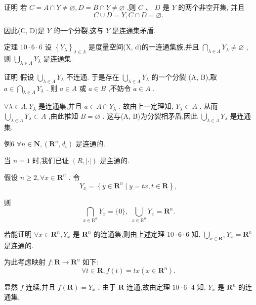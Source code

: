 证明 若 $C = A \cap  Y \neq  \varnothing ,D = B \cap  Y \neq  \varnothing$ ,则 $C\text{ 、 }D$ 是 $Y$ 的两个非空开集, 并且
$$C \cup  D = Y,C \cap  D = \varnothing .$$

因此(C, D)是 $Y$ 的一个分裂,这与 $Y$ 是连通集矛盾.

定理 ${10} \cdot  6 \cdot  6$ 设 ${\left\{  {Y}_{\lambda }\right\}  }_{\lambda  \in  \Lambda }$ 是度量空间(X, d)的一连通集族,并且 $\mathop{\bigcap }\limits_{{\lambda  \in  \Lambda }}{Y}_{\lambda } \neq  \varnothing$ ,则 $\mathop{\bigcup }\limits_{{\lambda  \in  \Lambda }}{Y}_{\lambda }$ 是连通集.

证明 假设 $\mathop{\bigcup }\limits_{{\lambda  \in  \Lambda }}{Y}_{\lambda }$ 不连通. 于是存在 $\mathop{\bigcup }\limits_{{\lambda  \in  \Lambda }}{Y}_{\lambda }$ 的一个分裂 (A, B),取 $a \in  \mathop{\bigcap }\limits_{{\lambda  \in  \Lambda }}{Y}_{\lambda }$ . 则 $a \in  A$ 或 $a \in  B$ ,不妨令 $a \in  A$ .

$\forall \lambda  \in  \Lambda ,{Y}_{\lambda }$ 是连通集,并且 $a \in  A \cap  {Y}_{\lambda }$ . 故由上一定理知, ${Y}_{\lambda } \subset  A$ . 从而 $\mathop{\bigcup }\limits_{{\lambda  \in  \Lambda }}{Y}_{\lambda } \subset  A$ ,由此推知 $B = \varnothing$ . 这与(A, B)为分裂相矛盾,因此 $\mathop{\bigcup }\limits_{{\lambda  \in  \Lambda }}{Y}_{\lambda }$ 是连通集.

例6 $\forall n \in  \mathbf{N},\left( {{\mathbf{R}}^{n},{d}_{i}}\right)$ 是连通的.

当 $n = 1$ 时,我们已证 $\left( {R,\left| \cdot \right| }\right)$ 是主通的.

假设 $n \geq  2,\forall x \in  {\mathbf{R}}^{n}$ . 令
$${Y}_{x} = \left\{  {y \in  {\mathbf{R}}^{n} \mid  y = {tx},t \in  \mathbf{R}}\right\}  ,$$

则
$$\mathop{\bigcap }\limits_{{x \in  {\mathrm{R}}^{n}}}{Y}_{x} = \{ 0\} ,\;\mathop{\bigcup }\limits_{{x \in  {\mathrm{R}}^{n}}}{Y}_{x} = {\mathbf{R}}^{n}.$$

若能证明 $\forall x \in  {\mathbf{R}}^{n},{Y}_{x}$ 是 ${\mathbf{R}}^{n}$ 的连通集,则由上述定理 ${10} \cdot  6 \cdot  6$ 知, $\mathop{\bigcup }\limits_{{x \in  {\mathbf{R}}^{n}}}{Y}_{x} = {\mathbf{R}}^{n}$ 是连通的.

为此考虑映射 $f : \mathbf{R} \rightarrow  {\mathbf{R}}^{n}$ 如下:
$$\forall t \in  \mathbf{R},f\left( t\right)  = {tx}\left( {x \in  {\mathbf{R}}^{n}}\right) .$$

显然 $f$ 连续,并且 $f\left( \mathbf{R}\right)  = {Y}_{x}$ . 由于 $\mathbf{R}$ 连通,故由定理 ${10} \cdot  6 \cdot  4$ 知, ${Y}_{x}$ 是 ${\mathbf{R}}^{n}$ 的连通集.

